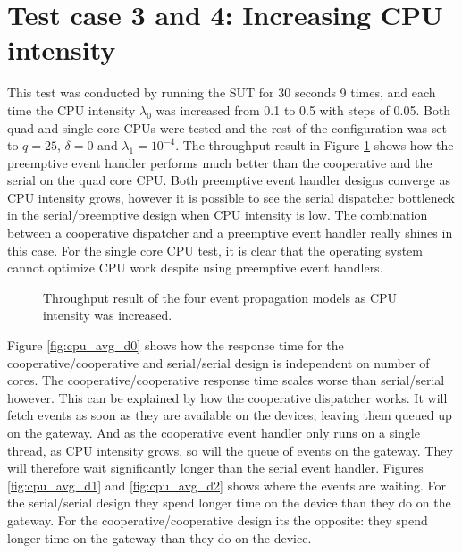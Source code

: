 \section{Test case 3 and 4: Increasing CPU intensity}

This test was conducted by running the SUT for 30 seconds 9 times, and each
time the CPU intensity $\lambda_0$ was increased from 0.1 to 0.5 with steps of
0.05. Both quad and single core CPUs were tested and the rest of the
configuration was set to $q = 25$, $\delta = 0$ and $\lambda_1 = 10^{-4}$. The
throughput result in Figure \ref{fig:cpu_throughput} shows how the preemptive
event handler performs much better than the cooperative and the serial on the
quad core CPU. Both preemptive event handler designs converge as CPU intensity
grows, however it is possible to see the serial dispatcher bottleneck in the
serial/preemptive design when CPU intensity is low. The combination between a
cooperative dispatcher and a preemptive event handler really shines in this
case. For the single core CPU test, it is clear that the operating system
cannot optimize CPU work despite using preemptive event handlers.

\begin{figure}[h!]
    \centering

    \caption[Throughput result when CPU intensity was increased.]{Throughput
    result of the four event propagation models as CPU intensity was
    increased.}

    \label{fig:cpu_throughput}
\end{figure}

Figure \ref{fig:cpu_avg_d0} shows how the response time for the
cooperative/cooperative and serial/serial design is independent on number of
cores. The cooperative/cooperative response time scales worse than
serial/serial however. This can be explained by how the cooperative dispatcher
works. It will fetch events as soon as they are available on the devices,
leaving them queued up on the gateway. And as the cooperative event handler
only runs on a single thread, as CPU intensity grows, so will the queue of
events on the gateway. They will therefore wait significantly longer than the
serial event handler. Figures \ref{fig:cpu_avg_d1} and \ref{fig:cpu_avg_d2}
shows where the events are waiting. For the serial/serial design they spend
longer time on the device than they do on the gateway. For the
cooperative/cooperative design its the opposite: they spend longer time on the
gateway than they do on the device.

